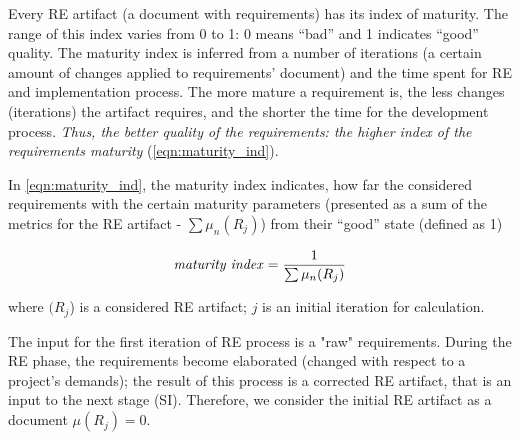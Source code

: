 \newpage
\hfill \break

\vspace{5.4cm}

Every RE artifact (a document with requirements) has its index of maturity. The range of this index varies from 0 to 1: 0 means ``bad'' and 1 indicates ``good'' quality.
The maturity index is inferred from a number of iterations (a certain amount of changes applied to requirements' document) and the time spent for RE and implementation process.
The more mature a requirement is, the less changes (iterations) the artifact requires, and the shorter the time for the development process. 
\textsl{Thus, the better quality of the requirements: the higher index of the requirements maturity} (\autoref{eqn:maturity_ind}). 

In \autoref{eqn:maturity_ind}, the maturity index indicates, how far the considered requirements with the certain maturity parameters (presented as a sum of the metrics for the RE artifact - $\sum\mu_{n}(R_{j})$) from their ``good'' state (defined as 1)

  \begin{equation}\label{eqn:maturity_ind}
\textrm{\textit{maturity index}} = \frac{1}{\sum\mu_{n}(R_{j})}
	\end{equation}

where $(R_{j}$) is a considered RE artifact; $j$ is an initial iteration for calculation.

The input for the first iteration of RE process is a "raw" requirements. During the RE phase, the requirements become elaborated (changed with respect to a project's demands); the result of this process is a corrected RE artifact, that is an input to the next stage (SI). Therefore, we consider the initial RE artifact as a document \textit{$\mu(R_{j})=0$}. 


